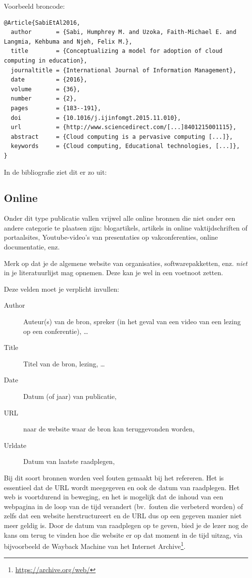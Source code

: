 Voorbeeld broncode:
\begin{verbatim}
@Article{SabiEtAl2016,
  author       = {Sabi, Humphrey M. and Uzoka, Faith-Michael E. and Langmia, Kehbuma and Njeh, Felix M.},
  title        = {Conceptualizing a model for adoption of cloud computing in education},
  journaltitle = {International Journal of Information Management},
  date         = {2016},
  volume       = {36},
  number       = {2},
  pages        = {183--191},
  doi          = {10.1016/j.ijinfomgt.2015.11.010},
  url          = {http://www.sciencedirect.com/[...]8401215001115},
  abstract     = {Cloud computing is a pervasive computing [...]},
  keywords     = {Cloud computing, Educational technologies, [...]},
}
\end{verbatim}

In de bibliografie ziet dit er zo uit: 

\subsection{Online}%
\label{ssec:online}

Onder dit type publicatie vallen vrijwel alle online bronnen die niet onder een andere categorie te plaatsen zijn: blogartikels, artikels in online vaktijdschriften of portaalsites, Youtube-video's van presentaties op vakconferenties, online documentatie, enz.

Merk op dat je de algemene website van organisaties, softwarepakketten, enz. \emph{niet} in je literatuurlijst mag opnemen. Deze kan je wel in een voetnoot zetten.

Deze velden moet je verplicht invullen:

\begin{description}
  \item[Author] Auteur(s) van de bron, spreker (in het geval van een video van een lezing op een conferentie), \ldots
  \item[Title] Titel van de bron, lezing, \ldots
  \item[Date] Datum (of jaar) van publicatie,
  \item[URL] naar de website waar de bron kan teruggevonden worden,
  \item[Urldate] Datum van laatste raadplegen,
\end{description}

Bij dit soort bronnen worden veel fouten gemaakt bij het refereren. Het is essentieel dat de URL wordt meegegeven en ook de datum van raadplegen. Het web is voortdurend in beweging, en het is mogelijk dat de inhoud van een webpagina in de loop van de tijd verandert (bv.\ fouten die verbeterd worden) of zelfs dat een website herstructureert en de URL dus op een gegeven manier niet meer geldig is. Door de datum van raadplegen op te geven, bied je de lezer nog de kans om terug te vinden hoe die website er op dat moment in de tijd uitzag, via bijvoorbeeld de Wayback Machine van het Internet Archive\footnote{\url{https://archive.org/web/}}.

